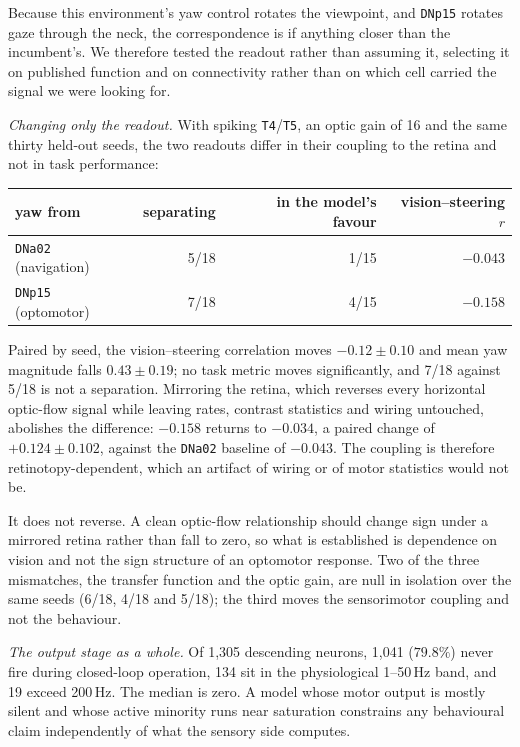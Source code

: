 \documentclass[10pt,twoside]{article}
\newcommand{\cell}[1]{\texttt{#1}}
\begin{document}
Because this environment's yaw control rotates the viewpoint, and
\cell{DNp15} rotates gaze through the neck, the correspondence is if anything
closer than the incumbent's. We therefore tested the readout rather than
assuming it, selecting it on published function and on connectivity rather
than on which cell carried the signal we were looking for.

\emph{Changing only the readout.} With spiking \cell{T4}/\cell{T5}, an optic
gain of 16 and the same thirty held-out seeds, the two readouts differ in
their coupling to the retina and not in task performance:

\begin{center}
\small
\begin{tabular}{lrrr}
\toprule
yaw from & separating & in the model's favour & vision--steering $r$\\
\midrule
\cell{DNa02} (navigation) & 5/18 & 1/15 & $-0.043$\\
\cell{DNp15} (optomotor)  & 7/18 & 4/15 & $\mathbf{-0.158}$\\
\bottomrule
\end{tabular}
\end{center}

Paired by seed, the vision--steering correlation moves $-0.12\pm0.10$ and mean
yaw magnitude falls $0.43\pm0.19$; no task metric moves significantly, and
7/18 against 5/18 is not a separation. Mirroring the retina, which reverses
every horizontal optic-flow signal while leaving rates, contrast statistics
and wiring untouched, abolishes the difference: $-0.158$ returns to $-0.034$,
a paired change of $+0.124\pm0.102$, against the \cell{DNa02} baseline of
$-0.043$. The coupling is therefore retinotopy-dependent, which an artifact of
wiring or of motor statistics would not be.

It does not reverse. A clean optic-flow relationship should change sign under
a mirrored retina rather than fall to zero, so what is established is
dependence on vision and not the sign structure of an optomotor response. Two
of the three mismatches, the transfer function and the optic gain, are null in
isolation over the same seeds (6/18, 4/18 and 5/18); the third moves the
sensorimotor coupling and not the behaviour.

\emph{The output stage as a whole.} Of 1{,}305 descending neurons, 1{,}041
($79.8\%$) never fire during closed-loop operation, 134 sit in the
physiological 1--50\,Hz band, and 19 exceed 200\,Hz. The median is zero. A
model whose motor output is mostly silent and whose active minority runs near
saturation constrains any behavioural claim independently of what the sensory
side computes.
\end{document}
